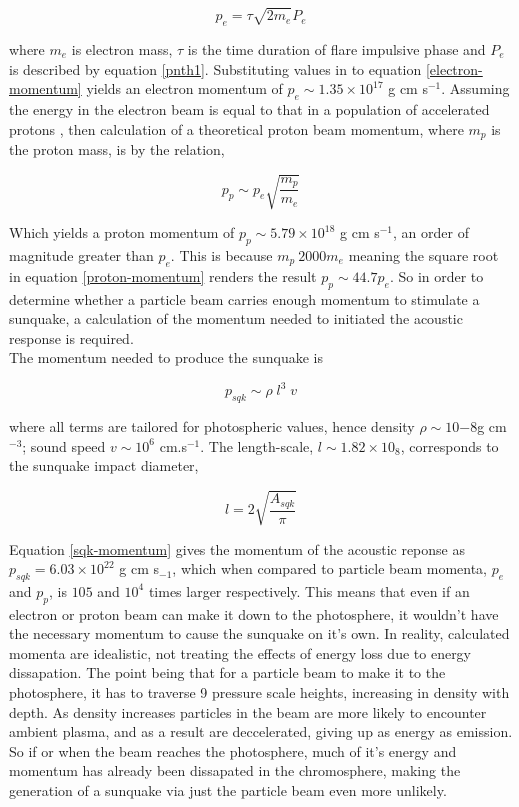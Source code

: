 \begin{equation}\label{electron-momentum}
p_e=\tau \sqrt{2m_e} P_{e}
\end{equation}

where $m_e$ is electron mass, $\tau$ is the time duration of flare impulsive phase and $P_{e}$ is described by equation \ref{pnth1}. Substituting values in to equation \ref{electron-momentum} yields an electron momentum of $p_e \sim 1.35{\times}10^{17}$ g cm s$^{-1}$. Assuming the energy in the electron beam is equal to that in a population of accelerated protons \citep{2000ApJ...542..513E}, then calculation of a theoretical proton beam momentum, where $m_p$ is the proton mass, is by the relation,

\begin{equation}\label{proton-momentum}
p_p \sim p_e \sqrt{\frac{m_p}{m_e}}
\end{equation}

Which yields a proton momentum of $p_p \sim 5.79{\times}10^18$ g cm s$^{-1}$, an order of magnitude greater than $p_e$. This is because $m_p ~ 2000m_e$ meaning the square root in equation \ref{proton-momentum} renders the result $p_p \sim 44.7p_e$. So in order to determine whether a particle beam carries enough momentum to stimulate a sunquake, a calculation of the momentum needed to initiated the acoustic response is required.\\

The momentum needed to produce the sunquake is

\begin{equation}
p_{sqk}\sim \rho \; l^{3} \; v
\end{equation}\label{sqk-momentum} 

where all terms are tailored for photospheric values, hence density $\rho \sim 10{-8}$g cm$^{-3}$; sound speed $v \sim 10^{6}$ cm.s$^{-1}$. The length-scale, $l \sim  1.82{\times}10_{8}$, corresponds to the sunquake impact diameter, 

\begin{equation}
l = 2\sqrt{\frac{A_{sqk}}{\pi}}
\end{equation}\label{lengthscale}

Equation \ref{sqk-momentum} gives the momentum of the acoustic reponse as $p_{sqk} = 6.03{\times}10^{22}$ g cm s$_{-1}$, which when compared to particle beam momenta, $p_e$ and $p_p$, is $10{5}$ and $10^{4}$ times larger respectively. This means that even if an electron or proton beam can make it down to the photosphere, it wouldn't have the necessary momentum to cause the sunquake on it's own. In reality, calculated momenta are idealistic, not treating the effects of energy loss due to energy dissapation. The point being that for a particle beam to make it to the photosphere, it has to traverse 9 pressure scale heights, increasing in density with depth. As density increases particles in the beam are more likely to encounter ambient plasma, and as a result are deccelerated, giving up as energy as emission. So if or when the beam reaches the photosphere, much of it's energy and momentum has already been dissapated in the chromosphere, making the generation of a sunquake via just the particle beam even more unlikely.


